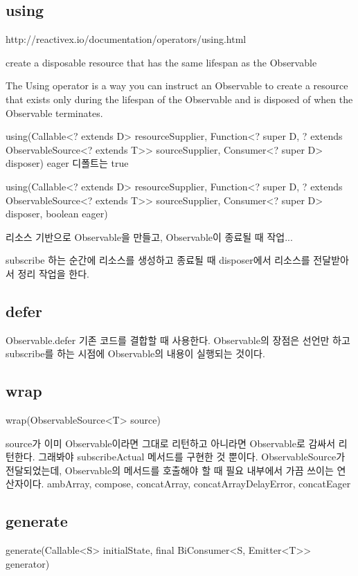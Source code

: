 \documentclass{book}
\begin{document}
\subsection{using}
http://reactivex.io/documentation/operators/using.html

create a disposable resource that has the same lifespan as the Observable

The Using operator is a way you can instruct an Observable to create a resource that exists only during the lifespan of the Observable and is disposed of when the Observable terminates.

using(Callable<? extends D> resourceSupplier, Function<? super D, ? extends ObservableSource<? extends T>> sourceSupplier, Consumer<? super D> disposer)
eager 디폴트는 true

using(Callable<? extends D> resourceSupplier, Function<? super D, ? extends ObservableSource<? extends T>> sourceSupplier, Consumer<? super D> disposer, boolean eager)

리소스 기반으로 Observable을 만들고, Observable이 종료될 때 작업...

subscribe 하는 순간에 리소스를 생성하고 종료될 때 disposer에서 리소스를 전달받아서 정리 작업을 한다.




\subsection{defer}
Observable.defer
기존 코드를 결합할 때 사용한다.
Observable의 장점은 선언만 하고 subscribe를 하는 시점에 Observable의 내용이 실행되는 것이다.



\subsection{wrap}
wrap(ObservableSource<T> source)

source가 이미 Observable이라면 그대로 리턴하고 아니라면 Observable로 감싸서 리턴한다.
그래봐야 subscribeActual 메서드를 구현한 것 뿐이다.
ObservableSource가 전달되었는데, Observable의 메서드를 호출해야 할 때 필요
내부에서 가끔 쓰이는 연산자이다.
ambArray, compose, concatArray, concatArrayDelayError, concatEager

\subsection{generate}
generate(Callable<S> initialState, final BiConsumer<S, Emitter<T>> generator)
\end{document}
